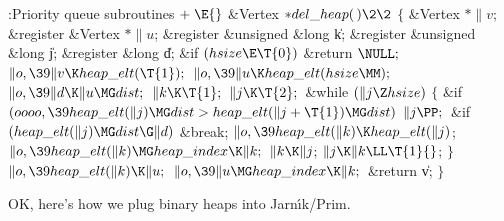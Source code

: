 \Y\B\4:Priority queue subroutines\X${}\mathrel+\E{}$\6
\1\1\&{Vertex} ${}{*}\\{del\_heap}(\,)\2\2{}$\6
${}\{{}$\5
\1\&{Vertex} ${}{*}\|v{}$;\6
\&{register} \&{Vertex} ${}{*}\|u{}$;\6
\&{register} \&{unsigned} \&{long} \|k;\6
\&{register} \&{unsigned} \&{long} \|j;\6
\&{register} \&{long} \|d;\7
\&{if} ${}(\\{hsize}\E\T{0}){}$\1\5
\&{return} ${}\NULL;{}$\2\6
${}\|o,\39\|v\K\\{heap\_elt}(\T{1});{}$\6
${}\|o,\39\|u\K\\{heap\_elt}(\\{hsize}\MM);{}$\6
${}\|o,\39\|d\K\|u\MG\\{dist};{}$\6
${}\|k\K\T{1};{}$\6
${}\|j\K\T{2};{}$\6
\&{while} ${}(\|j\Z\\{hsize}){}$\5
${}\{{}$\1\6
\&{if} ${}(\\{oooo},\39\\{heap\_elt}(\|j)\MG\\{dist}>\\{heap\_elt}(\|j+\T{1})%
\MG\\{dist}){}$\1\5
${}\|j\PP;{}$\2\6
\&{if} ${}(\\{heap\_elt}(\|j)\MG\\{dist}\G\|d){}$\1\5
\&{break};\2\6
${}\|o,\39\\{heap\_elt}(\|k)\K\\{heap\_elt}(\|j){}$;\6
${}\|o,\39\\{heap\_elt}(\|k)\MG\\{heap\_index}\K\|k;{}$\6
${}\|k\K\|j{}$;\6
${}\|j\K\|k\LL\T{1}{}$;\6
\4${}\}{}$\2\6
${}\|o,\39\\{heap\_elt}(\|k)\K\|u;{}$\6
${}\|o,\39\|u\MG\\{heap\_index}\K\|k;{}$\6
\&{return} \|v;\6
\4${}\}{}$\2\par
\fi

OK, here's how we plug binary heaps into Jarn{\'\i}k/Prim.

